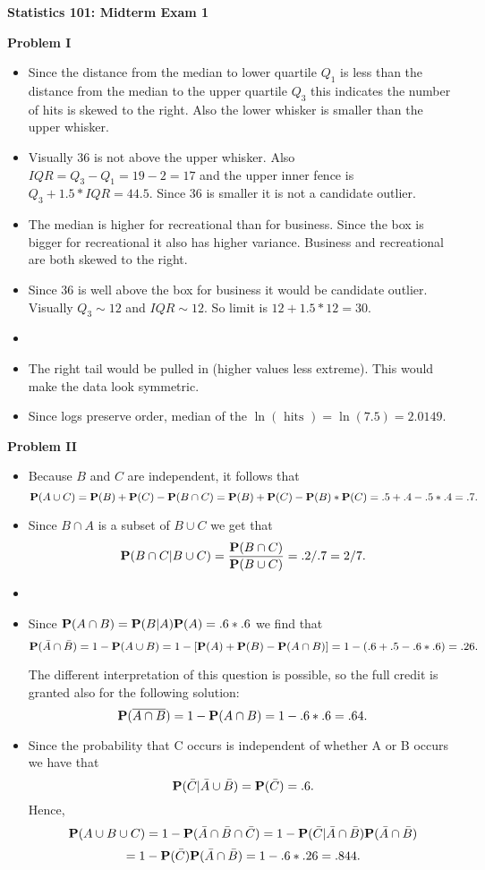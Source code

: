 \documentclass[10pt]{article}
\def\Pr{{\bf P}}
\begin{document}
\begin{center}
{\bf \large Statistics 101: Midterm Exam 1}
\end{center}


{\bf Problem I}
\begin{itemize}
\item[\bf A.] Since the distance from the median to lower quartile
$Q_1$ is less than the distance from the median to the upper
quartile $Q_3$ this indicates the number of hits is skewed to the
right. Also the lower whisker is smaller than the upper whisker.
\item[\bf B.] Visually 36 is not above the upper whisker.
Also $IQR=Q_3-Q_1=19-2=17$ and the upper inner fence is
$Q_3+1.5*IQR=44.5$. Since 36 is smaller it is not a candidate
outlier.
\item[\bf C.] The median is higher for recreational than for
business. Since the box is bigger for recreational it also has
higher variance. Business and recreational are both skewed to the
right.
\item[\bf D.] Since 36 is well above the box for business it would
be candidate outlier. Visually $Q_3\sim 12$ and $IQR\sim 12$. So
limit is $12+1.5*12=30$.
\item[\bf E.]
\item[\bf (i)] The right tail would be pulled in (higher values
less extreme). This would make the data look symmetric.
\item[\bf (ii)] Since logs preserve order, median of the
$\ln (\mbox{ hits }) =\ln(7.5)=2.0149$.
\end{itemize}

{\bf Problem II}

\begin{itemize}
\item[\bf A.] Because  $B$ and $C$ are independent, it follows
that
$$\Pr(A\cup C)=\Pr(B)+\Pr(C)-\Pr(B\cap C)=\Pr(B)+\Pr(C)- \Pr(B)*\Pr(C)
              =.5+.4-.5*.4=.7.$$
\item[\bf B.] Since $B\cap A$ is a subset of $B\cup C$ we get that
$$\Pr(B\cap C|B\cup C)=\frac{\Pr(B\cap C)}{\Pr(B\cup
C)}=.2/.7=2/7.$$
\item[\bf C.]
\item[\bf (i)] Since $\Pr(A\cap B)=\Pr(B|A)\Pr(A)=.6*.6$ we find that
$$\Pr(\bar{A}\cap\bar{B})=1-\Pr(A\cup B)=1-[\Pr(A)+\Pr(B)-\Pr(A\cap B)]=
1-(.6+.5-.6*.6)=.26.$$

The different interpretation of this question is possible, so the
full credit is granted also for the following solution:
$$\Pr(\overline{A\cap B})=1-\Pr(A\cap B)=1-.6*.6=.64.$$
\item[\bf (ii)] Since the probability that C occurs is independent
of whether A or B occurs  we have that
$$\Pr(\bar{C}|\bar{A}\cup\bar{B})=\Pr(\bar{C})=.6.$$
Hence,
$$\Pr(A\cup B\cup C)=1-\Pr(\bar{A}\cap\bar{B}\cap\bar{C})=
1-\Pr(\bar{C}|\bar{A}\cap\bar{B})\Pr(\bar{A}\cap\bar{B})$$
$$=1-\Pr(\bar{C})\Pr(\bar{A}\cap\bar{B})=1-.6*.26=.844.$$
\end{itemize}
\end{document}
